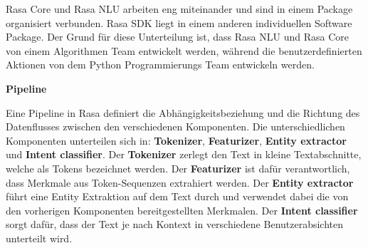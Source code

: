 Rasa Core und Rasa NLU arbeiten eng miteinander und sind in einem Package organisiert verbunden.
Rasa SDK liegt in einem anderen individuellen Software Package.
Der Grund für diese Unterteilung ist, dass Rasa NLU und Rasa Core von einem Algorithmen Team entwickelt werden,
während die benutzerdefinierten Aktionen von dem Python
Programmierungs Team entwickeln werden. \parencite[27]{Kong.2021}

\textbf{Pipeline}

Eine Pipeline in Rasa definiert die Abhängigkeitsbeziehung und die Richtung des Datenflusses zwischen den verschiedenen Komponenten.
Die unterschiedlichen Komponenten unterteilen sich in: 
\textbf{Tokenizer}, \textbf{Featurizer}, \textbf{Entity extractor} und \textbf{Intent classifier}.
Der \textbf{Tokenizer} zerlegt den Text in kleine Textabschnitte, welche als Tokens bezeichnet werden.
Der \textbf{Featurizer} ist dafür verantwortlich, dass Merkmale aus Token-Sequenzen extrahiert werden.
Der \textbf{Entity extractor} führt eine Entity Extraktion auf dem Text durch und verwendet dabei
 die von den vorherigen Komponenten bereitgestellten Merkmalen.
Der \textbf{Intent classifier} sorgt dafür, dass der Text je nach Kontext in verschiedene Benutzerabsichten unterteilt wird. \parencite[39]{Kong.2021} 

